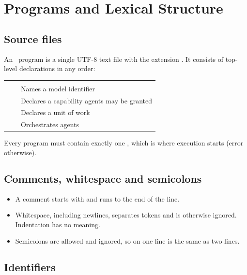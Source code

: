 \chapter{Programs and Lexical Structure}
\label{ch:lexical}

\section{Source files}

An \algolang\ program is a single UTF-8 text file with the extension . It consists of top-level declarations in any order:

\begin{center}
\small
\begin{tabularx}{\linewidth}{@{}L{2.6cm}L{4.2cm}Y@{}}
\toprule
{} &  & \\
\goldrule
{} &  & Names a model identifier\\
 &  & Declares a capability agents may be granted\\
 &  & Declares a unit of work\\
 &  & Orchestrates agents\\
\bottomrule
\end{tabularx}
\end{center}

Every program must contain exactly one , which is where execution starts (error  otherwise).

\section{Comments, whitespace and semicolons}

\begin{itemize}
  \item A comment starts with \code{//} and runs to the end of the line.
  \item Whitespace, including newlines, separates tokens and is otherwise ignored. Indentation has no meaning.
  \item Semicolons are allowed and ignored, so  on one line is the same as two lines.
\end{itemize}

\section{Identifiers}

